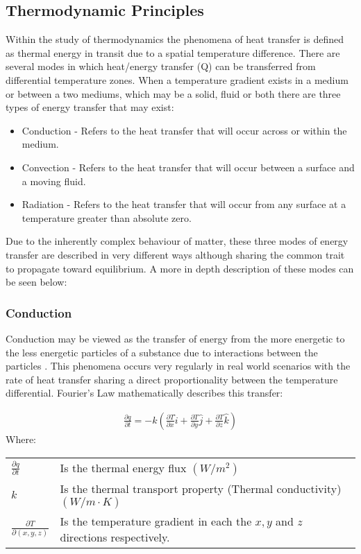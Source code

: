 \documentclass[12pt]{article}
\newcommand{\ts}{\textsuperscript}
\newcommand{\mycite}[1]{\ts{\cite{#1}}}
\begin{document}
\subsection{Thermodynamic Principles} 


Within the study of thermodynamics the phenomena of heat transfer is defined as thermal energy in transit due to a spatial temperature difference\mycite{bergman2011fundamentals}.
There are several modes in which heat/energy transfer (Q) can be transferred from differential temperature zones. When a temperature gradient exists in a medium or between a two mediums, which may be a solid, fluid or both there are three types of energy transfer that may exist: 
\begin{itemize}
	\item Conduction - Refers to the heat transfer that will occur across or within the medium. 
	\item Convection - Refers to the heat transfer that will occur between a surface and a moving fluid. 
	\item Radiation - Refers to the heat transfer that will occur from any surface at a temperature greater than absolute zero. 
\end{itemize}

Due to the inherently complex behaviour of matter, these three modes of energy transfer are described in very different ways although sharing the common trait to propagate toward equilibrium. A more in depth description of these modes can be seen below:  

\subsubsection{Conduction}
Conduction may be viewed as the transfer of energy from the more energetic to the less
energetic particles of a substance due to interactions between the particles \mycite{bergman2011fundamentals}. This phenomena occurs very regularly in real world scenarios with the rate of heat transfer sharing a direct proportionality between the temperature differential. Fourier's Law mathematically describes this transfer:

\begin{align} \label{condCart}
\frac{\partial q}{\partial t} = -k \left( \frac{\partial T}{\partial x} \hat{i} + \frac{\partial T}{\partial y} \hat{j} + \frac{\partial T}{\partial z} \hat{k} \right)
\end{align}
Where: \\ 
\begin{tabular}{l | l}
	$\frac{\partial q}{\partial t}$ & Is the thermal energy flux $(W/m^2)$ \\ 
	$k$ & Is the thermal transport property (Thermal conductivity) $(W/m \cdot K)$ \\ 
	$\frac{\partial T}{\partial(x,y,z)}$ & Is the temperature gradient in each the $x,y$ and $z$ directions respectively. 
\end{tabular}
\end{document}
